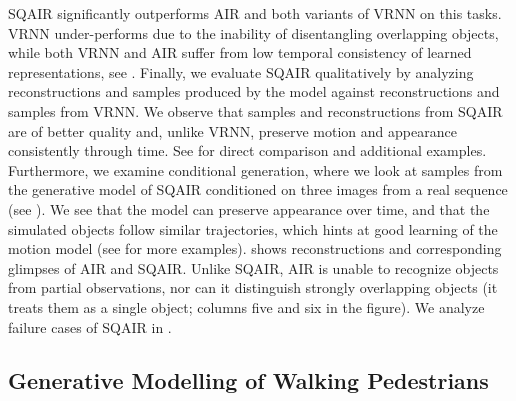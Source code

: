 \Gls{SQAIR} significantly outperforms \gls{AIR} and both variants of \gls{VRNN} on this tasks.
\Gls{VRNN} under-performs due to the inability of disentangling overlapping objects, while both \gls{VRNN} and \gls{AIR} suffer from low temporal consistency of learned representations, see . 
Finally, we evaluate \gls{SQAIR} qualitatively by analyzing reconstructions and samples produced by the model against reconstructions and samples from \gls{VRNN}.
We observe that samples and reconstructions from \gls{SQAIR} are of better quality and, unlike \gls{VRNN}, preserve motion and appearance consistently through time. See  for direct comparison and additional examples.
Furthermore, we examine conditional generation, where we look at samples from the generative model of \gls{SQAIR} conditioned on three images from a real sequence (see ).
We see that the model can preserve appearance over time, and that the simulated objects follow similar trajectories, which hints at good learning of the motion model (see  for more examples).
 shows reconstructions and corresponding glimpses of \gls{AIR} and \gls{SQAIR}. Unlike \gls{SQAIR}, \gls{AIR} is unable to recognize objects from partial observations, nor can it distinguish strongly overlapping objects (it treats them as a single object; columns five and six in the figure).
We analyze failure cases of \gls{SQAIR} in .



\subsection{Generative Modelling of Walking Pedestrians}
\label{sec:expr_duke}

